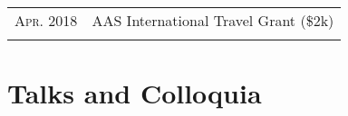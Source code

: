 \documentclass[letterpaper,10pt]{article}
\newcommand{\narrow}{-1.8ex}
\newcommand{\textwrap}{5.8in}       %
\begin{document}
\begin{longtable}{r|p{\textwrap}}
    \textsc{Apr. 2018} & AAS International Travel Grant (\$2k)    \\
    \multicolumn{2}{c}{} \\[\narrow]
\end{longtable}


\vspace*{-.7em}
\section{Talks and Colloquia}
\end{document}
